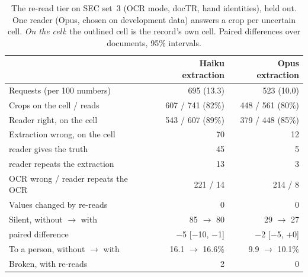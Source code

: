 \begin{table}[t]
\centering\tsize\setlength{\tabcolsep}{3pt}
\caption{The re-read tier on SEC set~3 (OCR mode, docTR, hand identities), held out. One reader (Opus, chosen on development data) answers a crop per uncertain cell. \emph{On the cell}: the outlined cell is the record's own cell. Paired differences over documents, 95\% intervals.}
\label{tab:reread}
\begin{tabular*}{\columnwidth}{@{\extracolsep{\fill}}lrr@{}}
\toprule
 & Haiku extraction & Opus extraction \\
\midrule
Requests (per 100 numbers) & 695 (13.3) & 523 (10.0) \\
Crops on the cell / reads & 607 / 741 (82\%) & 448 / 561 (80\%) \\
Reader right, on the cell & 543 / 607 (89\%) & 379 / 448 (85\%) \\
Extraction wrong, on the cell & 70 & 12 \\
\quad reader gives the truth & 45 & 5 \\
\quad reader repeats the extraction & 13 & 3 \\
OCR wrong / reader repeats the OCR & 221 / 14 & 214 / 8 \\
\midrule
Values changed by re-reads & 0 & 0 \\
Silent, without $\rightarrow$ with & 85 $\rightarrow$ 80 & 29 $\rightarrow$ 27 \\
\quad paired difference & $-$5 [$-$10, $-$1] & $-$2 [$-$5, +0] \\
To a person, without $\rightarrow$ with & 16.1 $\rightarrow$ 16.6\% & 9.9 $\rightarrow$ 10.1\% \\
Broken, with re-reads & 2 & 0 \\
\bottomrule
\end{tabular*}
\end{table}
